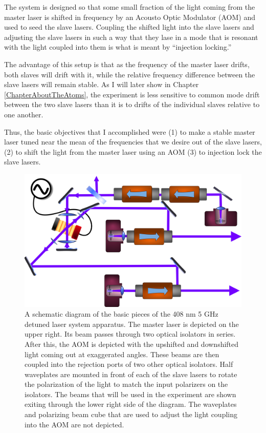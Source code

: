 The system is designed so that some small fraction of the light coming from the master laser is shifted in frequency by an Acousto Optic Modulator (AOM) and used to seed the slave lasers. Coupling the shifted light into the slave lasers and adjusting the slave lasers in such a way that they lase in a mode that is resonant with the light coupled into them is what is meant by ``injection locking.'' 

The advantage of this setup is that as the frequency of the master laser drifts, both slaves will drift with it, while the relative frequency difference between the slave lasers will remain stable.  As I will later show in Chapter \ref{ChapterAboutTheAtoms}, the experiment is less sensitive to common mode drift between the two slave lasers than it is to drifts of the individual slaves relative to one another. 


Thus, the basic objectives that I accomplished were (1) to make a stable master laser tuned near the mean of the frequencies that we desire out of the slave lasers, (2) to shift the light from the master laser using an AOM (3) to injection lock the slave lasers.

\begin{figure}
    \centerline{\includegraphics[width=1\textwidth]{diagramOfSetup3}}
    \caption[Diagram of the Setup]{\label{diagramOfSetup3}
	A schematic diagram of the basic pieces of the 408 nm 5 GHz detuned laser system apparatus. The master laser is depicted on the upper right. Its beam passes through two optical isolators in series. After this, the AOM is depicted with the upshifted and downshifted light coming out at exaggerated angles. These beams are then coupled into the rejection ports of two other optical isolators. Half waveplates are mounted in front of each of the slave lasers to rotate the polarization of the light to match the input polarizers on the isolators. The beams that will be used in the experiment are shown exiting through the lower right side of the diagram. The waveplates and polarizing beam cube that are used to adjust the light coupling into the AOM are not depicted.
    }
\end{figure}
